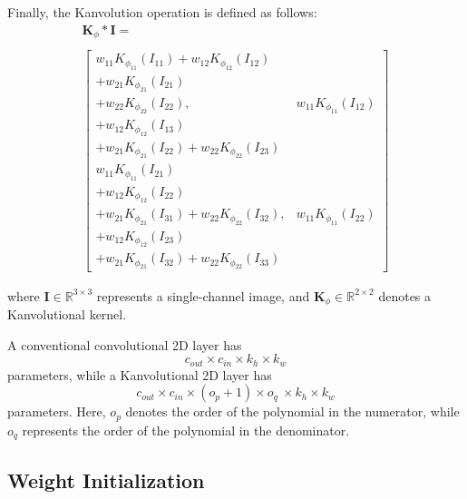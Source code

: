 \documentclass[conference]{IEEEtran}
\begin{document}
Finally, the Kanvolution operation is defined as follows:
\begin{multline*}
    \mathbf{K}_{\phi} * \mathbf{I} = \\ \\
    \left[
        \begin{array}{cc}
            \scriptstyle w_{11}K_{\phi_{11}}(I_{11}) + w_{12}K_{\phi_{12}}(I_{12}) \\
            + w_{21}K_{\phi_{21}}(I_{21})                                          \\
            + w_{22}K_{\phi_{22}}(I_{22}),                               &
            \scriptstyle w_{11}K_{\phi_{11}}(I_{12})                               \\
            + w_{12}K_{\phi_{12}}(I_{13})                                          \\
            + w_{21}K_{\phi_{21}}(I_{22}) + w_{22}K_{\phi_{22}}(I_{23})            \\
            \scriptstyle w_{11}K_{\phi_{11}}(I_{21})                               \\
            + w_{12}K_{\phi_{12}}(I_{22})                                          \\
            + w_{21}K_{\phi_{21}}(I_{31}) + w_{22}K_{\phi_{22}}(I_{32}), &
            \scriptstyle w_{11}K_{\phi_{11}}(I_{22})                               \\
            + w_{12}K_{\phi_{12}}(I_{23})
            \\ + w_{21}K_{\phi_{21}}(I_{32}) + w_{22}K_{\phi_{22}}(I_{33})
        \end{array}
        \right]
\end{multline*}

where $\mathbf{I} \in \mathbb{R}^{3 \times 3}$ represents a single-channel
image, and $\textbf{K}_{\phi} \in \mathbb{R}^{2 \times 2}$ denotes a
Kanvolutional kernel.

A conventional convolutional 2D layer has $$ c_{out} \times c_{in} \times k_h
    \times k_w $$ parameters, while a Kanvolutional 2D layer has $$ c_{out} \times
    c_{in} \times (o_p+1) \times o_q \ \times k_h \times k_w $$ parameters. Here,
\( o_p \) denotes the order of the polynomial in the numerator, while \( o_q \)
represents the order of the polynomial in the denominator.

\subsection{Weight Initialization}
\end{document}
